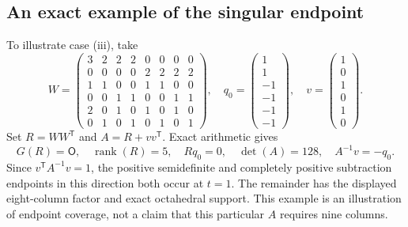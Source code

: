 \documentclass[11pt,a4paper]{article}
\theoremstyle{definition}
\newcommand{\OO}{\mathsf{O}}
\DeclareMathOperator{\rank}{rank}
\newcommand{\T}{\mathsf T}
\begin{document}
\subsection{An exact example of the singular endpoint}
To illustrate case (iii), take
\[
 W=\begin{pmatrix}
 3&2&2&2&0&0&0&0\\
 0&0&0&0&2&2&2&2\\
 1&1&0&0&1&1&0&0\\
 0&0&1&1&0&0&1&1\\
 2&0&1&0&1&0&1&0\\
 0&1&0&1&0&1&0&1
 \end{pmatrix},\quad
 q_0=\begin{pmatrix}1\\1\\-1\\-1\\-1\\-1\end{pmatrix},\quad
 v=\begin{pmatrix}1\\0\\1\\0\\1\\0\end{pmatrix}.
\]
Set $R=WW^{\T}$ and $A=R+vv^{\T}$. Exact arithmetic gives
\[
 G(R)=\OO,\quad \rank(R)=5,\quad Rq_0=0,\quad
 \det(A)=128,\quad A^{-1}v=-q_0.
\]
Since $v^{\T}A^{-1}v=1$, the positive semidefinite and completely positive subtraction endpoints in this direction both occur at $t=1$. The remainder has the displayed eight-column factor and exact octahedral support. This example is an illustration of endpoint coverage, not a claim that this particular $A$ requires nine columns.
\end{document}
